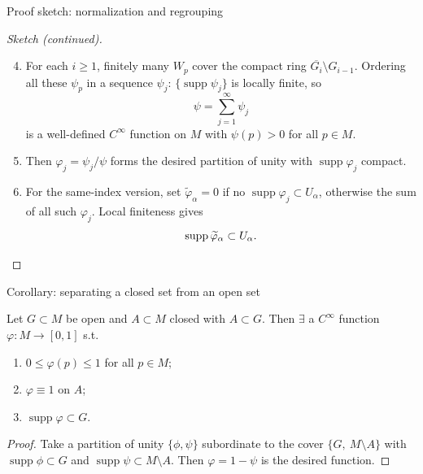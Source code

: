 \documentclass[10pt]{beamer}
\newcommand{\supp}{\operatorname{supp}}
\begin{document}
\begin{frame}{Proof sketch: normalization and regrouping}
	\begin{proof}[Sketch (continued)]
		\begin{enumerate}
			\setcounter{enumi}{3}
			\item For each $i \geq 1$, finitely many $W_p$ cover the compact
			      ring $\overline{G_i} \setminus G_{i-1}$. Ordering all
			      these $\psi_p$ in a sequence $\psi_j$:
			      $\{\supp \psi_j\}$ is locally finite, so
			      \[
				      \psi = \sum_{j=1}^{\infty} \psi_j
			      \]
			      is a well-defined $C^\infty$ function on $M$ with
			      $\psi(p) > 0$ for all $p \in M$.
			\item Then $\varphi_j = \psi_j / \psi$ forms the desired
			      partition of unity with $\supp \varphi_j$ compact.
			\item For the same-index version, set
			      $\widetilde{\varphi}_\alpha = 0$ if no $\supp \varphi_j
				      \subset U_\alpha$, otherwise the sum of all such
			      $\varphi_j$. Local finiteness gives
			      \[
				      \supp \widetilde{\varphi}_\alpha \subset U_\alpha .
				      \qedhere
			      \]
		\end{enumerate}
	\end{proof}
\end{frame}

\begin{frame}{Corollary: separating a closed set from an open set}
	\begin{corollary}
		Let $G \subset M$ be open and $A \subset M$ closed with
		$A \subset G$. Then $\exists$ a $C^\infty$ function
		$\varphi: M \to [0,1]$ s.t.
		\begin{enumerate}
			\item[(a)] $0 \leq \varphi(p) \leq 1$ for all $p \in M$;
			\item[(b)] $\varphi \equiv 1$ on $A$;
			\item[(c)] $\supp \varphi \subset G$.
		\end{enumerate}
	\end{corollary}
	\begin{proof}
		Take a partition of unity $\{\phi, \psi\}$ subordinate to the cover
		$\{G,\ M \setminus A\}$ with $\supp \phi \subset G$ and
		$\supp \psi \subset M \setminus A$. Then $\varphi = 1 - \psi$ is
		the desired function.
	\end{proof}
\end{frame}
\end{document}

